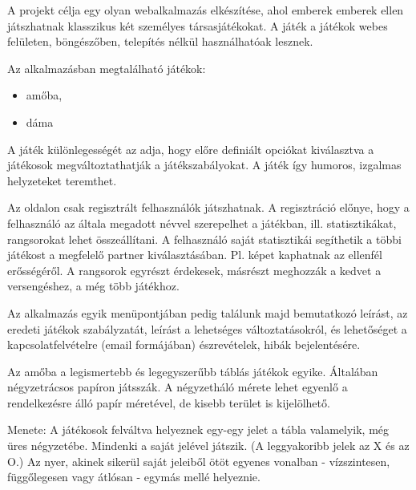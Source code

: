 



A projekt célja egy olyan webalkalmazás elkészítése, ahol emberek emberek ellen játszhatnak klasszikus két személyes társasjátékokat. A játék a játékok webes felületen, böngészőben, telepítés nélkül használhatóak lesznek.

Az alkalmazásban megtalálható játékok:
\begin{itemize}
	\item amőba,
	\item dáma
\end{itemize}

A játék különlegességét az adja, hogy előre definiált opciókat kiválasztva a játékosok megváltoztathatják a játékszabályokat. A játék így humoros, izgalmas helyzeteket teremthet.

Az oldalon csak regisztrált felhasználók játszhatnak. A regisztráció előnye, hogy a felhasználó az általa megadott névvel szerepelhet a játékban, ill. statisztikákat, rangsorokat lehet összeállítani. A felhasználó saját statisztikái segíthetik a többi játékost a megfelelő partner kiválasztásában. Pl. képet kaphatnak az ellenfél erősségéről. A rangsorok egyrészt érdekesek, másrészt meghozzák a kedvet a versengéshez, a még több játékhoz.

Az alkalmazás egyik menüpontjában pedig találunk majd bemutatkozó leírást, az eredeti játékok szabályzatát, leírást a lehetséges változtatásokról, és lehetőséget a kapcsolatfelvételre (email formájában) észrevételek, hibák bejelentésére. 


Az amőba a legismertebb és legegyszerűbb táblás játékok egyike. Általában négyzetrácsos papíron játsszák. A négyzetháló mérete lehet egyenlő a rendelkezésre álló papír méretével, de kisebb terület is kijelölhető.

Menete: A játékosok felváltva helyeznek egy-egy jelet a tábla valamelyik, még üres négyzetébe. Mindenki a saját jelével játszik. (A leggyakoribb jelek az X és az O.) Az nyer, akinek sikerül saját jeleiből ötöt egyenes vonalban - vízszintesen, függőlegesen vagy átlósan - egymás mellé helyeznie. \cite{fiveinarow-rules}

